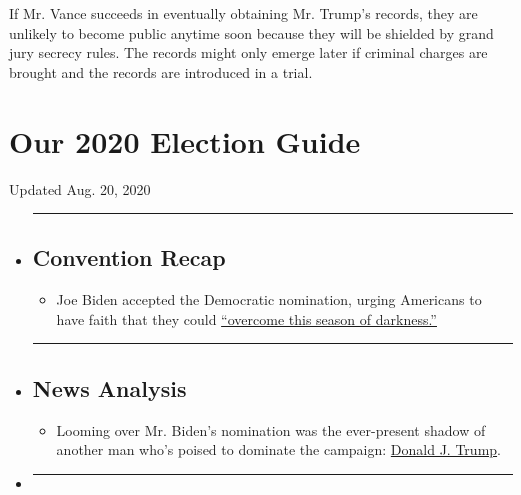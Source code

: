 If Mr. Vance succeeds in eventually obtaining Mr. Trump's records, they
are unlikely to become public anytime soon because they will be shielded
by grand jury secrecy rules. The records might only emerge later if
criminal charges are brought and the records are introduced in a trial.

\hypertarget{our-2020-election-guide}{%
\section{Our 2020 Election Guide}\label{our-2020-election-guide}}

Updated Aug. 20, 2020

\begin{itemize}
\item
  \begin{center}\rule{0.5\linewidth}{\linethickness}\end{center}

  \hypertarget{convention-recap}{%
  \subsection{Convention Recap}\label{convention-recap}}

  \begin{itemize}
  \tightlist
  \item
    Joe Biden accepted the Democratic nomination, urging Americans to
    have faith that they could
    \href{https://www.nytimes3xbfgragh.onion/2020/08/20/us/politics/Joe-Biden-accepts-democratic-nomination.html?action=click\&pgtype=Article\&state=default\&region=BELOW_MAIN_CONTENT\&context=storylines_guide}{``overcome
    this season of darkness.''}
  \end{itemize}
\item
  \begin{center}\rule{0.5\linewidth}{\linethickness}\end{center}

  \hypertarget{news-analysis}{%
  \subsection{News Analysis}\label{news-analysis}}

  \begin{itemize}
  \tightlist
  \item
    Looming over Mr. Biden's nomination was the ever-present shadow of
    another man who's poised to dominate the campaign:
    \href{https://www.nytimes3xbfgragh.onion/2020/08/20/us/politics/biden-dnc-speech-trump.html?action=click\&pgtype=Article\&state=default\&region=BELOW_MAIN_CONTENT\&context=storylines_guide}{Donald
    J. Trump}.
  \end{itemize}
\item
  \begin{center}\rule{0.5\linewidth}{\linethickness}\end{center}


\end{itemize}
